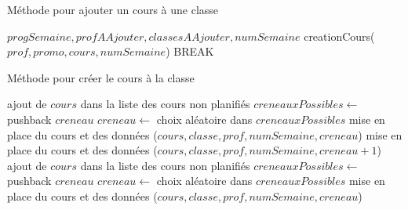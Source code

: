 \newpage

\begin{algorithm}
\caption {Méthode pour ajouter un cours à une classe}
\begin{algorithmic}
\REQUIRE $progSemaine, profAAjouter, classesAAjouter, numSemaine$
\STATE creationCours($prof, promo, cours, numSemaine$)
\STATE BREAK
\ENDIF
\ENDFOR
\end{algorithmic}
\end{algorithm}

\newpage

\begin{algorithm}
\caption {Méthode pour créer le cours à la classe}
\begin{algorithmic}
	\STATE ajout de $cours$ dans la liste des cours non planifiés
			\STATE $creneauxPossibles \leftarrow$ pushback $creneau$
		\ENDIF
	\ENDFOR
		\STATE $creneau \leftarrow$ choix aléatoire dans $creneauxPossibles$
		\STATE mise en place du cours et des données ($cours, classe, prof, numSemaine, creneau$)
		\STATE mise en place du cours et des données ($cours, classe, prof, numSemaine, creneau +1$)
	\ENDIF
	\STATE ajout de $cours$ dans la liste des cours non planifiés
\ELSE
			\STATE $creneauxPossibles \leftarrow$ pushback $creneau$
		\ENDIF
	\STATE $creneau \leftarrow$ choix aléatoire dans $creneauxPossibles$
	\STATE mise en place du cours et des données ($cours, classe, prof, numSemaine, creneau$)
	\ENDFOR
\ENDIF
\end{algorithmic}
\end{algorithm}





